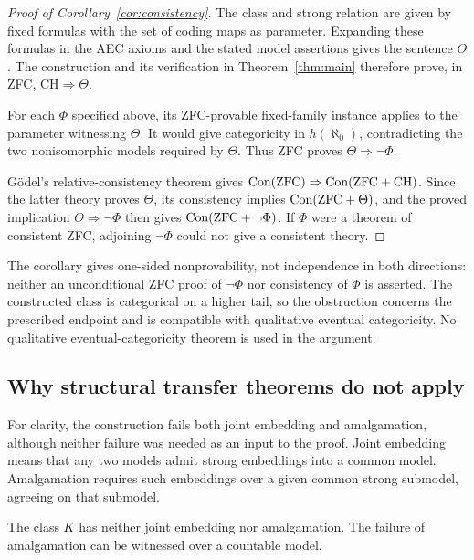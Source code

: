\begin{proof}[Proof of Corollary~\ref{cor:consistency}]
The class and strong relation are given by fixed formulas with the
set of coding maps as parameter. Expanding these formulas in the
AEC axioms and the stated model assertions gives the sentence
\(\Theta\). The construction and its verification in
Theorem~\ref{thm:main} therefore prove, in ZFC,
\(\mathrm{CH}\Rightarrow\Theta\).

For each \(\Phi\) specified above, its ZFC-provable fixed-family
instance applies to the parameter witnessing \(\Theta\).
It would give categoricity in \(h(\aleph_0)\), contradicting
the two nonisomorphic models required by \(\Theta\).
Thus ZFC proves \(\Theta\Rightarrow\neg\Phi\).

G\"odel's relative-consistency theorem
\cite{Godel1938} gives
\(\operatorname{Con}(\mathrm{ZFC})\Rightarrow
  \operatorname{Con}(\mathrm{ZFC}+\mathrm{CH})\).
Since the latter theory proves \(\Theta\), its consistency implies
\(\operatorname{Con}(\mathrm{ZFC}+\Theta)\), and the proved implication
\(\Theta\Rightarrow\neg\Phi\) then gives
\(\operatorname{Con}(\mathrm{ZFC}+\neg\Phi)\).
If \(\Phi\) were a theorem of consistent ZFC, adjoining
\(\neg\Phi\) could not give a consistent theory.
\end{proof}

The corollary gives one-sided nonprovability, not independence in both
directions: neither an unconditional ZFC proof of \(\neg\Phi\) nor
consistency of \(\Phi\) is asserted. The constructed class is categorical
on a higher tail, so the obstruction concerns the prescribed endpoint
and is compatible with qualitative eventual categoricity. No qualitative
eventual-categoricity theorem is used in the argument.

\subsection{Why structural transfer theorems do not apply}

For clarity, the construction fails both joint embedding and
amalgamation, although neither failure was needed as an input to the
proof. Joint embedding means that any two models admit strong
embeddings into a common model. Amalgamation requires such embeddings
over a given common strong submodel, agreeing on that submodel.

\begin{proposition}\label{prop:no-amalgamation}
The class \(K\) has neither joint embedding nor amalgamation.
The failure of amalgamation can be witnessed over a countable model.
\end{proposition}

